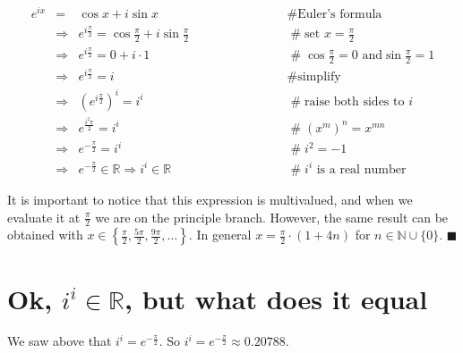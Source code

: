 \documentclass{article}
\theoremstyle{definition}
\begin{document}
\smallskip
\begin{equation*}
\begin{array}{lllll}
e^{ix}
&=& \cos x + i \sin x                           	&\hspace{7em} \mathrel{\#} \text{Euler's formula}   \\
[2pt]
&\Rightarrow& e^{i \frac{\pi}{2}} = \cos \frac{\pi}{2} + i \sin \frac{\pi}{2}
                                                	&\hspace{7em} \mathrel{\#} \text{set $x = \frac{\pi}{2}$} \\
[2pt]
&\Rightarrow& e^{i \frac{\pi}{2}} = 0 +  i \cdot 1
                                                	&\hspace{7em} \mathrel{\#} \cos \frac{\pi}{2} = 0
                                                	  \text{ and} \sin \frac{\pi}{2} = 1 \\
[2pt]
&\Rightarrow& e^{i \frac{\pi}{2}}  =  i         	&\hspace{7em}\mathrel{\#} \text{simplify} \\
[2pt]
&\Rightarrow& {(e^{i \frac{\pi}{2}})}^i =  i^i  	&\hspace{7em} \mathrel{\#} \text{raise both sides to $i$} \\
[2pt]
&\Rightarrow& e^{\frac{i^2 \pi}{2}} =  i^i      	&\hspace{7em} \mathrel{\#}  {(x^m)}^n = x^{mn} \\
[2pt]
&\Rightarrow& e^{- \frac {\pi}{2}} =  i^i       	&\hspace{7em} \mathrel{\#} i^2 = -1 \\
[2pt]
&\Rightarrow& e^{- \frac {\pi}{2}} \in \mathbb{R} \Rightarrow i^i \in \mathbb{R}
                                               		&\hspace{7em} \mathrel{\#} \text{$i^i$ is a real number} 
\end{array}
\end{equation*}

\medskip
\noindent
It is important to notice that this expression is multivalued,
and when we evaluate it at $\frac{\pi}{2}$ we are on the
principle branch. However, the same result can be obtained with
$x \in \left \{\frac{\pi}{2}, \frac{5 \pi}{2}, \frac{9\pi}{2},
\hdots \right \}$.  In general $x = \frac{\pi}{2} \cdot (1+4n)$
for $n \in \mathbb{N} \cup \{0\}$. $\blacksquare$


\section{Ok, $i^i \in \mathbb{R}$, but what does it equal}
\label{what_does_i_to_the_i_equal}
We saw above that $i^i = e^{- \frac {\pi}{2}}$. So 
$i^i = e^{- \frac {\pi}{2}} \approx 0.20788$.
\end{document}
